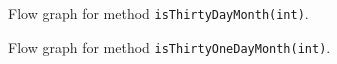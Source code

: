 \documentclass[a4paper]{article}
\begin{document}
\begin{figure}[htpb!]
    \begin{center}
        \caption{Flow graph for method \texttt{isThirtyDayMonth(int)}.}
        \label{figure:thirty-day}
    \end{center}
\end{figure}

\begin{figure}[htpb!]
    \begin{center}
        \caption{Flow graph for method \texttt{isThirtyOneDayMonth(int)}.}
        \label{figure:thirty-one-day}
    \end{center}
\end{figure}
\end{document}
